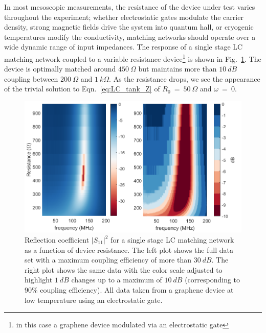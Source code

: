 In most mesoscopic measurements, the resistance of the device under test varies throughout the experiment; whether electrostatic gates modulate the carrier density, strong magnetic fields drive the system into quantum hall, or cryogenic temperatures modify the conductivity, matching networks should operate over a wide dynamic range of input impedances. The response of a single stage LC matching network coupled to a variable resistance device\footnote{in this case a graphene device modulated via an electrostatic gate} is shown in Fig.~\ref{fig:S11vsR}. The device is optimally matched around $450~\Omega$ but maintains more than $10~dB$ coupling between $200~\Omega$ and $1~k\Omega$. As the resistance drops, we see the appearance of the trivial solution to Eqn.~\ref{eq:LC_tank_Z} of $R_0~=~50~\Omega$ and $\omega~=~0$. 
\begin{figure}
\centering
\includegraphics[width=120mm]{figures/Johnson_noise_thermometry/S11vsR.png}
\caption{Reflection coefficient $|S_{11}|^2$ for a single stage LC matching network as a function of device resistance. The left plot shows the full data set with a maximum coupling efficiency of more than $30~dB$. The right plot shows the same data with the color scale adjusted to highlight $1~dB$ changes up to a maximum of $10~dB$ (corresponding to $90\%$ coupling efficiency). All data taken from a graphene device at low temperature using an electrostatic gate.}
\label{fig:S11vsR}
\end{figure}

